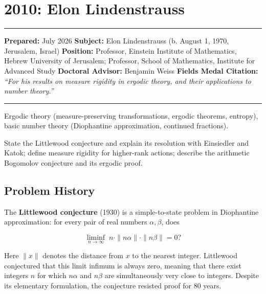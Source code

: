 \chapter{2010: Elon Lindenstrauss}\label{ch2010elonlindenstrauss:elon-lindenstrauss-fields-medal-2010-a-comprehensive-report-on-his-work-and-impact}

\begin{center}\rule{0.5\linewidth}{0.5pt}\end{center}

\textbf{Prepared:} July 2026 \textbf{Subject:} Elon Lindenstrauss (b. August 1, 1970, Jerusalem, Israel) \textbf{Position:} Professor, Einstein Institute of Mathematics, Hebrew University of Jerusalem; Professor, School of Mathematics, Institute for Advanced Study \textbf{Doctoral Advisor:} Benjamin Weiss \textbf{Fields Medal Citation:} \emph{``For his results on measure rigidity in ergodic theory, and their applications to number theory.''}

\begin{center}\rule{0.5\linewidth}{0.5pt}\end{center}

\begin{prereqs} Ergodic theory (measure-preserving transformations, ergodic theorems, entropy), basic number theory (Diophantine approximation, continued fractions). \end{prereqs}

\begin{objectives} State the Littlewood conjecture and explain its resolution with Einsiedler and Katok; define measure rigidity for higher-rank actions; describe the arithmetic Bogomolov conjecture and its ergodic proof. \end{objectives}

\section{Problem History}\label{ch2010elonlindenstrauss:problem-history}

The \textbf{Littlewood conjecture} (1930) is a simple-to-state problem in Diophantine approximation: for every pair of real numbers $\alpha, \beta$, does

\[
\liminf_{n \to \infty} \; n \cdot \|n\alpha\| \cdot \|n\beta\| = 0?
\]

Here $\|x\|$ denotes the distance from $x$ to the nearest integer. Littlewood conjectured that this limit infimum is always zero, meaning that there exist integers $n$ for which $n\alpha$ and $n\beta$ are simultaneously very close to integers. Despite its elementary formulation, the conjecture resisted proof for 80 years.

